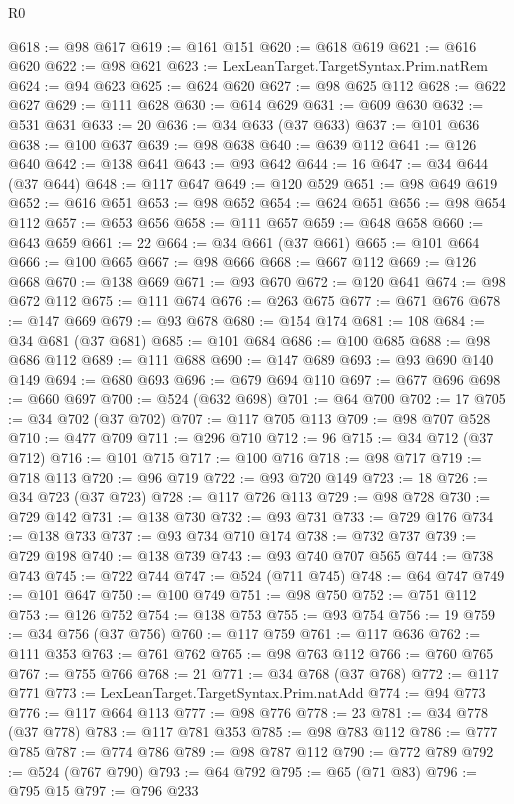 \begin{lexlean}{R0}
\begin{coremodule}
@618 := @98 @617
@619 := @161 @151
@620 := @618 @619
@621 := @616 @620
@622 := @98 @621
@623 := LexLeanTarget.TargetSyntax.Prim.natRem
@624 := @94 @623
@625 := @624 @620
@627 := @98 @625 @112
@628 := @622 @627
@629 := @111 @628
@630 := @614 @629
@631 := @609 @630
@632 := @531 @631
@633 := 20
@636 := @34 @633 (@37 @633)
@637 := @101 @636
@638 := @100 @637
@639 := @98 @638
@640 := @639 @112
@641 := @126 @640
@642 := @138 @641
@643 := @93 @642
@644 := 16
@647 := @34 @644 (@37 @644)
@648 := @117 @647
@649 := @120 @529
@651 := @98 @649 @619
@652 := @616 @651
@653 := @98 @652
@654 := @624 @651
@656 := @98 @654 @112
@657 := @653 @656
@658 := @111 @657
@659 := @648 @658
@660 := @643 @659
@661 := 22
@664 := @34 @661 (@37 @661)
@665 := @101 @664
@666 := @100 @665
@667 := @98 @666
@668 := @667 @112
@669 := @126 @668
@670 := @138 @669
@671 := @93 @670
@672 := @120 @641
@674 := @98 @672 @112
@675 := @111 @674
@676 := @263 @675
@677 := @671 @676
@678 := @147 @669
@679 := @93 @678
@680 := @154 @174
@681 := 108
@684 := @34 @681 (@37 @681)
@685 := @101 @684
@686 := @100 @685
@688 := @98 @686 @112
@689 := @111 @688
@690 := @147 @689
@693 := @93 @690 @140 @149
@694 := @680 @693
@696 := @679 @694 @110
@697 := @677 @696
@698 := @660 @697
@700 := @524 (@632 @698)
@701 := @64 @700
@702 := 17
@705 := @34 @702 (@37 @702)
@707 := @117 @705 @113
@709 := @98 @707 @528
@710 := @477 @709
@711 := @296 @710
@712 := 96
@715 := @34 @712 (@37 @712)
@716 := @101 @715
@717 := @100 @716
@718 := @98 @717
@719 := @718 @113
@720 := @96 @719
@722 := @93 @720 @149
@723 := 18
@726 := @34 @723 (@37 @723)
@728 := @117 @726 @113
@729 := @98 @728
@730 := @729 @142
@731 := @138 @730
@732 := @93 @731
@733 := @729 @176
@734 := @138 @733
@737 := @93 @734 @710 @174
@738 := @732 @737
@739 := @729 @198
@740 := @138 @739
@743 := @93 @740 @707 @565
@744 := @738 @743
@745 := @722 @744
@747 := @524 (@711 @745)
@748 := @64 @747
@749 := @101 @647
@750 := @100 @749
@751 := @98 @750
@752 := @751 @112
@753 := @126 @752
@754 := @138 @753
@755 := @93 @754
@756 := 19
@759 := @34 @756 (@37 @756)
@760 := @117 @759
@761 := @117 @636
@762 := @111 @353
@763 := @761 @762
@765 := @98 @763 @112
@766 := @760 @765
@767 := @755 @766
@768 := 21
@771 := @34 @768 (@37 @768)
@772 := @117 @771
@773 := LexLeanTarget.TargetSyntax.Prim.natAdd
@774 := @94 @773
@776 := @117 @664 @113
@777 := @98 @776
@778 := 23
@781 := @34 @778 (@37 @778)
@783 := @117 @781 @353
@785 := @98 @783 @112
@786 := @777 @785
@787 := @774 @786
@789 := @98 @787 @112
@790 := @772 @789
@792 := @524 (@767 @790)
@793 := @64 @792
@795 := @65 (@71 @83)
@796 := @795 @15
@797 := @796 @233

\end{coremodule}
\end{lexlean}
